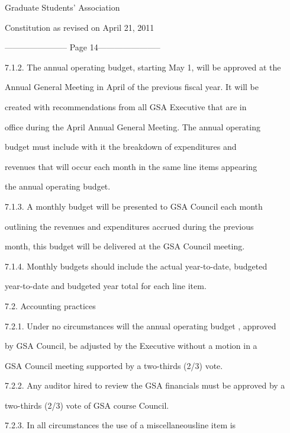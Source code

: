 \documentclass{article}
\begin{document}
       Graduate Students’ Association  



  Constitution as revised on April 21, 2011  


----------------------- Page 14-----------------------

7.1.2. The annual operating budget, starting May 1, will be approved at the  

Annual General Meeting in April of the previous fiscal year. It will be  

created  with  recommendations  from  all  GSA  Executive  that  are  in  

office during the April Annual General Meeting. The annual operating  

budget  must  include  with  it  the  breakdown  of  expenditures  and  

revenues that will occur each month in the same line items appearing  

the annual operating budget.  



7.1.3. A  monthly  budget  will  be  presented  to  GSA  Council  each  month  

outlining  the  revenues  and  expenditures  accrued  during  the  previous  

month, this budget will be delivered at the GSA Council meeting.  



7.1.4. Monthly  budgets  should  include  the  actual  year-to-date,  budgeted  

year-to-date and budgeted year total for each line item.  



7.2. Accounting practices  



7.2.1. Under  no  circumstances  will  the  annual  operating  budget  ,  approved  

by GSA Council, be adjusted by the Executive  without a motion in a  

GSA  Council meeting supported by a two-thirds (2/3) vote.  



7.2.2. Any auditor hired to review the GSA financials must be approved by a  

two-thirds (2/3) vote of GSA course Council.  



7.2.3. In    all   circumstances       the    use   of   a   miscellaneousline   item    is  
\end{document}
